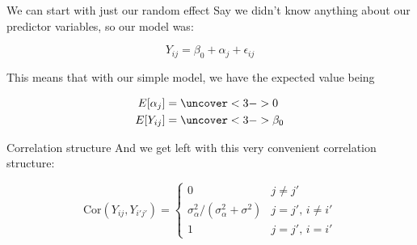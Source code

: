 \documentclass[
  ignorenonframetext,
  aspectratio=169,
]{beamer}
\begin{document}
\begin{frame}{We can start with just our random effect}
\label{we-can-start-with-just-our-random-effect}
Say we didn't know anything about our predictor variables, so our model
was:

\begin{equation}
Y_{ij} = \beta_0 + \alpha_j + \epsilon_{ij}
\end{equation}

\pause

This means that with our simple model, we have the expected value being

\begin{equation}
\begin{aligned}
E[\alpha_{j}] &= \uncover<3->{0} \\
E[Y_{ij}] &= \uncover<3->{\beta_0}
\end{aligned}
\end{equation}

\pause

\end{frame}

\begin{frame}{Correlation structure}
\label{correlation-structure}
And we get left with this very convenient correlation structure:

\begin{equation}
\text{Cor}(Y_{ij},Y_{i'j'}) =
\begin{cases}
0 & j \neq j' \\
\sigma^2_{\alpha}/(\sigma^2_{\alpha} + \sigma^2) & j = j',\, i \neq i' \\
1 & j = j',\, i = i'
\end{cases}
\end{equation}
\end{frame}
\end{document}
